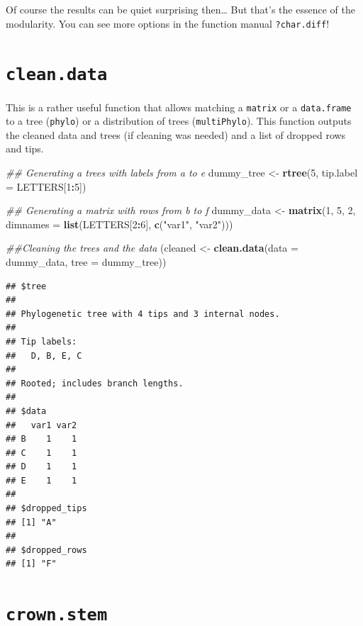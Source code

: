 \documentclass[]{book}
\newenvironment{Shaded}{\begin{snugshade}}{\end{snugshade}}
\newcommand{\CommentTok}[1]{\textcolor[rgb]{0.56,0.35,0.01}{\textit{#1}}}
\newcommand{\DataTypeTok}[1]{\textcolor[rgb]{0.13,0.29,0.53}{#1}}
\newcommand{\DecValTok}[1]{\textcolor[rgb]{0.00,0.00,0.81}{#1}}
\newcommand{\KeywordTok}[1]{\textcolor[rgb]{0.13,0.29,0.53}{\textbf{#1}}}
\newcommand{\NormalTok}[1]{#1}
\newcommand{\OperatorTok}[1]{\textcolor[rgb]{0.81,0.36,0.00}{\textbf{#1}}}
\newcommand{\StringTok}[1]{\textcolor[rgb]{0.31,0.60,0.02}{#1}}
\begin{document}
Of course the results can be quiet surprising then\ldots{} But that's the essence of the modularity. You can see more options in the function manual \texttt{?char.diff}!

\hypertarget{clean.data}{%
\section{\texorpdfstring{\texttt{clean.data}}{clean.data}}\label{clean.data}}

This is a rather useful function that allows matching a \texttt{matrix} or a \texttt{data.frame} to a tree (\texttt{phylo}) or a distribution of trees (\texttt{multiPhylo}).
This function outputs the cleaned data and trees (if cleaning was needed) and a list of dropped rows and tips.

\begin{Shaded}
\begin{Highlighting}[]
\CommentTok{## Generating a trees with labels from a to e}
\NormalTok{dummy_tree <-}\StringTok{ }\KeywordTok{rtree}\NormalTok{(}\DecValTok{5}\NormalTok{, }\DataTypeTok{tip.label =}\NormalTok{ LETTERS[}\DecValTok{1}\OperatorTok{:}\DecValTok{5}\NormalTok{])}

\CommentTok{## Generating a matrix with rows from b to f}
\NormalTok{dummy_data <-}\StringTok{ }\KeywordTok{matrix}\NormalTok{(}\DecValTok{1}\NormalTok{, }\DecValTok{5}\NormalTok{, }\DecValTok{2}\NormalTok{, }\DataTypeTok{dimnames =} \KeywordTok{list}\NormalTok{(LETTERS[}\DecValTok{2}\OperatorTok{:}\DecValTok{6}\NormalTok{], }\KeywordTok{c}\NormalTok{(}\StringTok{"var1"}\NormalTok{, }\StringTok{"var2"}\NormalTok{)))}

\CommentTok{##Cleaning the trees and the data}
\NormalTok{(cleaned <-}\StringTok{ }\KeywordTok{clean.data}\NormalTok{(}\DataTypeTok{data =}\NormalTok{ dummy_data, }\DataTypeTok{tree =}\NormalTok{ dummy_tree))}
\end{Highlighting}
\end{Shaded}

\begin{verbatim}
## $tree
## 
## Phylogenetic tree with 4 tips and 3 internal nodes.
## 
## Tip labels:
##   D, B, E, C
## 
## Rooted; includes branch lengths.
## 
## $data
##   var1 var2
## B    1    1
## C    1    1
## D    1    1
## E    1    1
## 
## $dropped_tips
## [1] "A"
## 
## $dropped_rows
## [1] "F"
\end{verbatim}

\hypertarget{crown.stem}{%
\section{\texorpdfstring{\texttt{crown.stem}}{crown.stem}}\label{crown.stem}}
\end{document}
